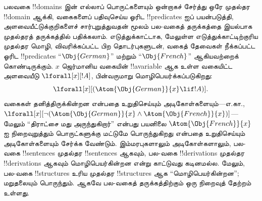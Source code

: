 \documentclass[../../../include/open-logic-section]{subfiles}
\begin{document}
பலவகை !!{domain}s இன் எல்லாப் பொருட்களையும் ஒன்றாகச் சேர்த்து ஒரே
முதல்தர !!{domain} ஆக்கி, வகைகளைப் பதிவுசெய்ய ஓரிட
!!{predicate}s ஐப் பயன்படுத்தி, அளவையீட்டுக்குறிகளைச் சார்புறுத்துவதன்
மூலம் பல-வகைத் தருக்கத்தை இயல்பாக முதல்தரத் தருக்கத்தில் பதிக்கலாம்.
எடுத்துக்காட்டாக, மேலுள்ள எடுத்துக்காட்டிற்குரிய முதல்தர மொழி, விவரிக்கப்பட்ட
பிற தொடர்புகளுடன், வகைத் தேவைகள் நீக்கப்பட்ட ஓரிட !!{predicate}s
``$\Obj{German}$'' மற்றும் ``$\Obj{French}$'' ஆகியவற்றைக்
கொண்டிருக்கும். $x$ ஜெர்மானிய வகையின் !!a{variable} ஆக உள்ள வகையிட்ட
அளவையீடு $\lforall[x][!A]$, பின்வருமாறு மொழிபெயர்க்கப்படுகிறது:
\[
\lforall[x][(\Atom{\Obj{German}}{x} \lif !A)].
\]
வகைகள் தனித்திருக்கின்றன என்பதை உறுதிசெய்யும் அடிகோள்களையும்---எ.கா.,
$\lforall[x][\lnot (\Atom{\Obj{German}}{x} \land
  \Atom{\Obj{French}}{x})]$---மேலும் ``திராட்சை மது அருந்துகிறார்''
என்பது பயனிலை $\Atom{\Obj{French}}{x}$ ஐ நிறைவுறுத்தும் பொருட்களுக்கு
மட்டுமே பொருந்துகிறது என்பதை உறுதிசெய்யும் அடிகோள்களையும் சேர்க்க
வேண்டும். இம்மரபுகளாலும் அடிகோள்களாலும், பல-வகை !!{sentence}s முதல்தர
!!{sentence}s ஆகவும், பல-வகை !!{derivation}s முதல்தர !!{derivation}s
ஆகவும் மொழிபெயர்கின்றன என்று காட்டுவது கடினமல்ல. மேலும், பல-வகை
!!{structure}s உரிய முதல்தர !!{structure}s ஆக ``மொழிபெயர்கின்றன'';
மறுதலையும் பொருந்தும். ஆகவே பல-வகைத் தருக்கத்திற்கும் ஒரு நிறைவுத்
தேற்றம் உள்ளது.
\end{document}
